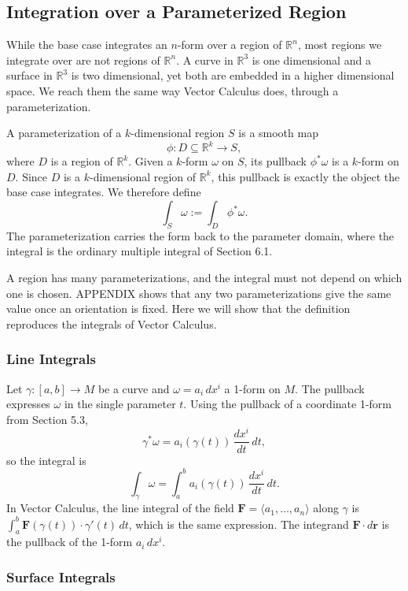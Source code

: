 \documentclass[12pt]{article}
\newcommand{\R}{\mathbb{R}}
\newcommand{\bv}[1]{\mathbf{#1}}
\begin{document}
\subsection{Integration over a Parameterized Region}

While the base case integrates an $n$-form over a region of $\R^n$, most regions we integrate over are not regions of $\R^n$. A curve in $\R^3$ is one dimensional and a surface in $\R^3$ is two dimensional, yet both are embedded in a higher dimensional space. We reach them the same way Vector Calculus does, through a parameterization.

A parameterization of a $k$-dimensional region $S$ is a smooth map
\[
\phi: D \subseteq \R^k \to S,
\]
where $D$ is a region of $\R^k$. Given a $k$-form $\omega$ on $S$, its pullback $\phi^*\omega$ is a $k$-form on $D$. Since $D$ is a $k$-dimensional region of $\R^k$, this pullback is exactly the object the base case integrates. We therefore define
\[
\int_S \omega := \int_D \phi^*\omega.
\]
The parameterization carries the form back to the parameter domain, where the integral is the ordinary multiple integral of Section 6.1.

A region has many parameterizations, and the integral must not depend on which one is chosen. APPENDIX shows that any two parameterizations give the same value once an orientation is fixed. Here we will show that the definition reproduces the integrals of Vector Calculus.

\subsubsection{Line Integrals}

Let $\gamma: [a,b] \to M$ be a curve and $\omega = a_i\,dx^i$ a 1-form on $M$. The pullback expresses $\omega$ in the single parameter $t$. Using the pullback of a coordinate 1-form from Section 5.3,
\[
\gamma^*\omega = a_i(\gamma(t))\,\frac{dx^i}{dt}\,dt,
\]
so the integral is
\[
\int_\gamma \omega = \int_a^b a_i(\gamma(t))\,\frac{dx^i}{dt}\,dt.
\]
In Vector Calculus, the line integral of the field $\bv{F} = \langle a_1, \dots, a_n \rangle$ along $\gamma$ is $\int_a^b \bv{F}(\gamma(t)) \cdot \gamma'(t)\,dt$, which is the same expression. The integrand $\bv{F} \cdot d\bv{r}$ is the pullback of the 1-form $a_i\,dx^i$.

\subsubsection{Surface Integrals}
\end{document}
